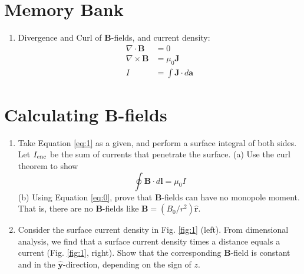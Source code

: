 \documentclass[12pt]{article}
\begin{document}
\maketitle
\small
\section{Memory Bank}
\begin{enumerate}
\item Divergence and Curl of $\mathbf{B}$-fields, and current density:
\begin{align}
\nabla \cdot \mathbf{B} &= 0 \label{eq:0} \\
\nabla \times \mathbf{B} &= \mu_0 \mathbf{J} \label{eq:1} \\
I &= \int \mathbf{J} \cdot d\mathbf{a}
\end{align}
\end{enumerate}

\section{Calculating B-fields}

\begin{enumerate}
\item Take Equation \ref{eq:1} as a given, and perform a surface integral of both sides.  Let $I_{\rm enc}$ be the sum of currents that penetrate the surface.  (a) Use the curl theorem to show
\begin{equation}
\boxed{
\oint \mathbf{B} \cdot d\mathbf{l} = \mu_0 I
}
\end{equation} 
(b) Using Equation \ref{eq:0}, prove that $\mathbf{B}$-fields can have no monopole moment.  That is, there are no $\mathbf{B}$-fields like $\mathbf{B} = (B_0/r^2) \hat{\mathbf{r}}$.
\\ \vspace{2cm}
\item Consider the surface current density in Fig. \ref{fig:1} (left).  From dimensional analysis, we find that a surface current density times a distance equals a current (Fig. \ref{fig:1}, right).  Show that the corresponding $\mathbf{B}$-field is constant and in the $\hat{\mathbf{y}}$-direction, depending on the sign of $z$.
\end{enumerate}
\end{document}

